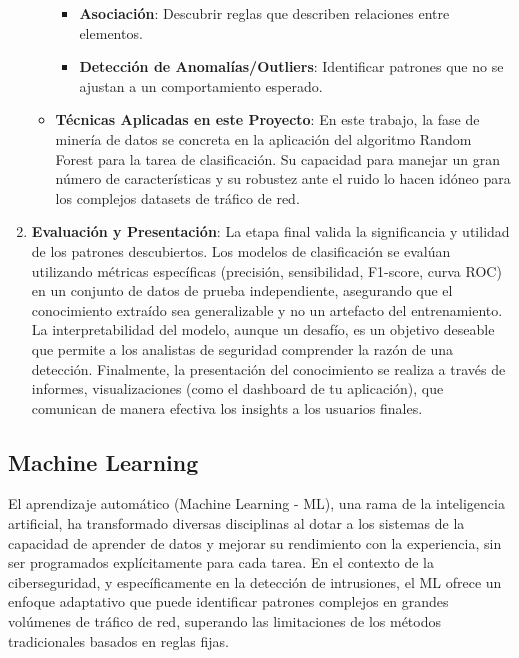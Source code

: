 \begin{enumerate}
\begin{itemize}
\begin{itemize}
            \item\textbf{Asociación}: Descubrir reglas que describen relaciones entre elementos.
            
            \item\textbf{Detección de Anomalías/Outliers}: Identificar patrones que no se ajustan a un comportamiento esperado.
              
        \end{itemize}
    \item\textbf{Técnicas Aplicadas en este Proyecto}: En este trabajo, la fase de minería de datos se concreta en la aplicación del algoritmo Random Forest para la tarea de clasificación. Su capacidad para manejar un gran número de características y su robustez ante el ruido lo hacen idóneo para los complejos datasets de tráfico de red.
    \end{itemize}
    
    \item\textbf{Evaluación y Presentación}: La etapa final valida la significancia y utilidad de los patrones descubiertos. Los modelos de clasificación se evalúan utilizando métricas específicas (precisión, sensibilidad, F1-score, curva ROC) en un conjunto de datos de prueba independiente, asegurando que el conocimiento extraído sea generalizable y no un artefacto del entrenamiento. La interpretabilidad del modelo, aunque un desafío, es un objetivo deseable que permite a los analistas de seguridad comprender la razón de una detección. Finalmente, la presentación del conocimiento se realiza a través de informes, visualizaciones (como el dashboard de tu aplicación), que comunican de manera efectiva los insights a los usuarios finales.

\end{enumerate}
\subsection{Machine Learning}

El aprendizaje automático (Machine Learning - ML), una rama de la inteligencia artificial, ha transformado diversas disciplinas al dotar a los sistemas de la capacidad de aprender de datos y mejorar su rendimiento con la experiencia, sin ser programados explícitamente para cada tarea. En el contexto de la ciberseguridad, y específicamente en la detección de intrusiones, el ML ofrece un enfoque adaptativo que puede identificar patrones complejos en grandes volúmenes de tráfico de red, superando las limitaciones de los métodos tradicionales basados en reglas fijas.

